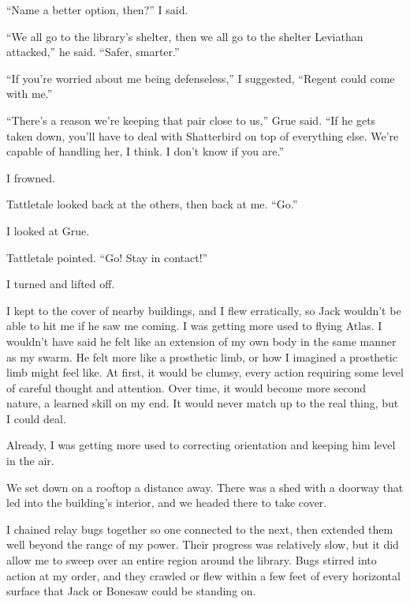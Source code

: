 ``Name a better option, then?'' I said.



``We all go to the library's shelter, then we all go to the shelter Leviathan attacked,'' he said.  ``Safer, smarter.''



``If you're worried about me being defenseless,'' I suggested, ``Regent could come with me.''



``There's a reason we're keeping that pair close to us,'' Grue said.  ``If he gets taken down, you'll have to deal with Shatterbird on top of everything else.  We're capable of handling her, I think.  I don't know if you are.''



I frowned.



Tattletale looked back at the others, then back at me.  ``Go.''



I looked at Grue.



Tattletale pointed.  ``Go!  Stay in contact!''



I turned and lifted off.



I kept to the cover of nearby buildings, and I flew erratically, so Jack wouldn't be able to hit me if he saw me coming.  I was getting more used to flying Atlas.  I wouldn't have said he felt like an extension of my own body in the same manner as my swarm.  He felt more like a prosthetic limb, or how I imagined a prosthetic limb might feel like.  At first, it would be clumsy, every action requiring some level of careful thought and attention.  Over time, it would become more second nature, a learned skill on my end.  It would never match up to the real thing, but I could deal.



Already, I was getting more used to correcting orientation and keeping him level in the air.



We set down on a rooftop a distance away.  There was a shed with a doorway that led into the building's interior, and we headed there to take cover.



I chained relay bugs together so one connected to the next, then extended them well beyond the range of my power.  Their progress was relatively slow, but it did allow me to sweep over an entire region around the library.  Bugs stirred into action at my order, and they crawled or flew within a few feet of every horizontal surface that Jack or Bonesaw could be standing on.



